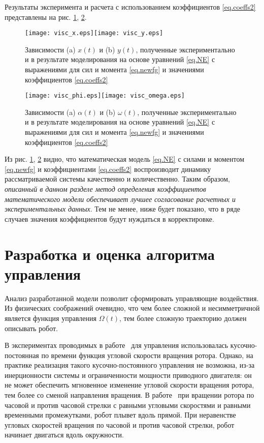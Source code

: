 Результаты эксперимента и расчета с использованием коэффициентов \eqref{eq.coeffs2} представлены на рис. \ref{fig.xy1}, \ref{fig.phiOmega1}.

\begin{figure}[h!]
	\centering
	\texttt{[image: visc\_x.eps]}\hspace{20mm}\texttt{[image: visc\_y.eps]}
	\caption{Зависимости (a) $x(t)$ и (b) $y(t)$, полученные экспериментально и в результате моделирования на основе уравнений \eqref{eq.NE} с выражениями для сил и момента \eqref{eq.newfg} и значениями коэффициентов \eqref{eq.coeffs2}}\label{fig.xy1}
\end{figure}

\begin{figure}[h!]
	\centering
	\texttt{[image: visc\_phi.eps]}\hspace{20mm}\texttt{[image: visc\_omega.eps]}
	\caption{Зависимости (a) $\alpha(t)$ и (b) $\omega(t)$, полученные экспериментально и в результате моделирования на основе уравнений \eqref{eq.NE} с выражениями для сил и момента \eqref{eq.newfg} и значениями коэффициентов \eqref{eq.coeffs2}}\label{fig.phiOmega1}
\end{figure}

Из рис. \ref{fig.xy1}, \ref{fig.phiOmega1} видно, что математическая модель \eqref{eq.NE} с силами и моментом \eqref{eq.newfg} и коэффициентами \eqref{eq.coeffs2} воспроизводит динамику рассматриваемой системы качественно и количественно. Таким образом, \textit{описанный в данном разделе метод определения коэффициентов математического модели обеспечивает лучшее согласование расчетных и экспериментальных данных}. Тем не менее, ниже будет показано, что в ряде случаев значения коэффициентов будут нуждаться в корректировке.



\section{Разработка и оценка алгоритма управления}



Анализ разработанной модели позволит сформировать управляющие воздействия. Из физических соображений очевидно, что чем более сложной и несимметричной является функция управления $\Omega(t)$, тем более сложную траекторию должен описывать робот. 

В экспериментах проводимых в работе~\cite{Pollard_Tallapragada_2016} для управления использовалась кусочно-постоянная по времени функция угловой скорости вращения ротора. Однако, на практике реализация такого кусочно-постоянного управления не возможна, из-за инерционности системы и ограниченности мощности приводного двигателя: он не может обеспечить мгновенное изменение угловой скорости вращения ротора, тем более со сменой направления вращения. В работе~\cite{Pollard_Tallapragada_2016} при вращении ротора по часовой и против часовой стрелки с равными угловыми скоростями и равными временными промежутками, робот плывет вдоль прямой. При неравенстве угловых скоростей вращения по часовой и против часовой стрелки, робот начинает двигаться вдоль окружности.

